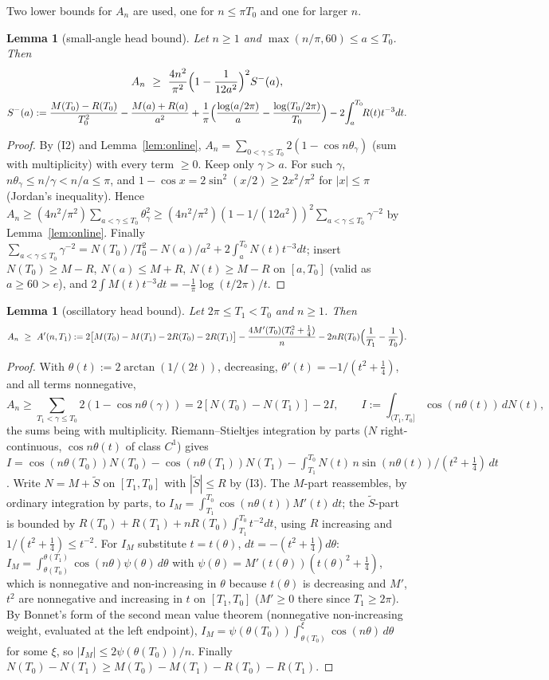 \documentclass[11pt]{article}
\newtheorem{lemma}[theorem]{Lemma}
\theoremstyle{remark}
\begin{document}
Two lower bounds for $A_n$ are used, one for $n\le\pi T_0$ and one for larger $n$.

\begin{lemma}[small-angle head bound]\label{lem:head1}
Let $n\ge1$ and $\max(n/\pi,60)\le a\le T_0$. Then
\[
A_n\ \ge\ \frac{4n^2}{\pi^2}\Bigl(1-\frac1{12a^2}\Bigr)^2 S^-(a),
\]
\[
S^-(a):=\frac{M(T_0)-R(T_0)}{T_0^2}-\frac{M(a)+R(a)}{a^2}+\frac1\pi\Bigl(\frac{\log(a/2\pi)}{a}-\frac{\log(T_0/2\pi)}{T_0}\Bigr)-2\!\int_a^{T_0}\!\!R(t)t^{-3}dt .
\]
\end{lemma}
\begin{proof}
By (I2) and Lemma~\ref{lem:online}, $A_n=\sum_{0<\gamma\le T_0}2(1-\cos n\theta_\gamma)$ (sum with multiplicity) with every term $\ge0$. Keep only $\gamma>a$. For such $\gamma$, $n\theta_\gamma\le n/\gamma<n/a\le\pi$, and $1-\cos x=2\sin^2(x/2)\ge2x^2/\pi^2$ for $|x|\le\pi$ (Jordan's inequality). Hence $A_n\ge(4n^2/\pi^2)\sum_{a<\gamma\le T_0}\theta_\gamma^2\ge(4n^2/\pi^2)(1-1/(12a^2))^2\sum_{a<\gamma\le T_0}\gamma^{-2}$ by Lemma~\ref{lem:online}. Finally $\sum_{a<\gamma\le T_0}\gamma^{-2}=N(T_0)/T_0^2-N(a)/a^2+2\int_a^{T_0}N(t)t^{-3}dt$; insert $N(T_0)\ge M-R$, $N(a)\le M+R$, $N(t)\ge M-R$ on $[a,T_0]$ (valid as $a\ge60>e$), and $2\int M(t)t^{-3}dt=-\frac1\pi\log(t/2\pi)/t$.
\end{proof}

\begin{lemma}[oscillatory head bound]\label{lem:head2}
Let $2\pi\le T_1<T_0$ and $n\ge1$. Then
\[
A_n\ \ge\ A'(n,T_1):=2\bigl[M(T_0)-M(T_1)-2R(T_0)-2R(T_1)\bigr]-\frac{4M'(T_0)(T_0^2+\tfrac14)}{n}-2nR(T_0)\Bigl(\frac1{T_1}-\frac1{T_0}\Bigr).
\]
\end{lemma}
\begin{proof}
With $\theta(t):=2\arctan(1/(2t))$, decreasing, $\theta'(t)=-1/(t^2+\frac14)$, and all terms nonnegative,
\[
A_n\ge\sum_{T_1<\gamma\le T_0}2(1-\cos n\theta(\gamma))=2[N(T_0)-N(T_1)]-2I,\qquad I:=\int_{(T_1,T_0]}\cos(n\theta(t))\,dN(t),
\]
the sums being with multiplicity. Riemann--Stieltjes integration by parts ($N$ right-continuous, $\cos n\theta(t)$ of class $C^1$) gives
$I=\cos(n\theta(T_0))N(T_0)-\cos(n\theta(T_1))N(T_1)-\int_{T_1}^{T_0}N(t)\,n\sin(n\theta(t))/(t^2+\frac14)\,dt$. Write $N=M+\tilde S$ on $[T_1,T_0]$ with $|\tilde S|\le R$ by (I3). The $M$-part reassembles, by ordinary integration by parts, to $I_M=\int_{T_1}^{T_0}\cos(n\theta(t))M'(t)\,dt$; the $\tilde S$-part is bounded by $R(T_0)+R(T_1)+nR(T_0)\int_{T_1}^{T_0}t^{-2}dt$, using $R$ increasing and $1/(t^2+\frac14)\le t^{-2}$. For $I_M$ substitute $t=t(\theta)$, $dt=-(t^2+\frac14)d\theta$: $I_M=\int_{\theta(T_0)}^{\theta(T_1)}\cos(n\theta)\psi(\theta)\,d\theta$ with $\psi(\theta)=M'(t(\theta))(t(\theta)^2+\frac14)$, which is nonnegative and non-increasing in $\theta$ because $t(\theta)$ is decreasing and $M'$, $t^2$ are nonnegative and increasing in $t$ on $[T_1,T_0]$ ($M'\ge0$ there since $T_1\ge2\pi$). By Bonnet's form of the second mean value theorem (nonnegative non-increasing weight, evaluated at the left endpoint), $I_M=\psi(\theta(T_0))\int_{\theta(T_0)}^{\xi}\cos(n\theta)\,d\theta$ for some $\xi$, so $|I_M|\le2\psi(\theta(T_0))/n$. Finally $N(T_0)-N(T_1)\ge M(T_0)-M(T_1)-R(T_0)-R(T_1)$.
\end{proof}
\end{document}
